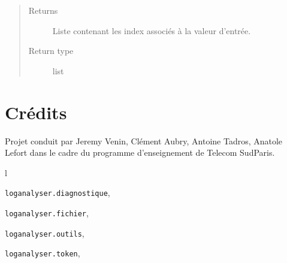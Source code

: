 \documentclass[letterpaper,10pt,english]{sphinxmanual}
\begin{document}
\begin{fulllineitems}
\begin{fulllineitems}
\begin{quote}
\begin{description}
\item[{Returns}] \leavevmode
Liste contenant les index associés à la valeur d'entrée.

\item[{Return type}] \leavevmode
list

\end{description}\end{quote}

\end{fulllineitems}


\end{fulllineitems}



\chapter{Crédits}
\label{index:credits}
Projet conduit par Jeremy Venin, Clément Aubry, Antoine Tadros, Anatole Lefort dans le cadre du programme
d'enseignement de Telecom SudParis.


\renewcommand{\indexname}{Python Module Index}
\begin{theindex}
\def\bigletter#1{{\Large\sffamily#1}\nopagebreak\vspace{1mm}}
\bigletter{l}
\item {\texttt{loganalyser.diagnostique}}, \pageref{loganalyser:module-loganalyser.diagnostique}
\item {\texttt{loganalyser.fichier}}, \pageref{loganalyser:module-loganalyser.fichier}
\item {\texttt{loganalyser.outils}}, \pageref{loganalyser:module-loganalyser.outils}
\item {\texttt{loganalyser.token}}, \pageref{loganalyser:module-loganalyser.token}
\end{theindex}

\renewcommand{\indexname}{Index}
\printindex
\end{document}
